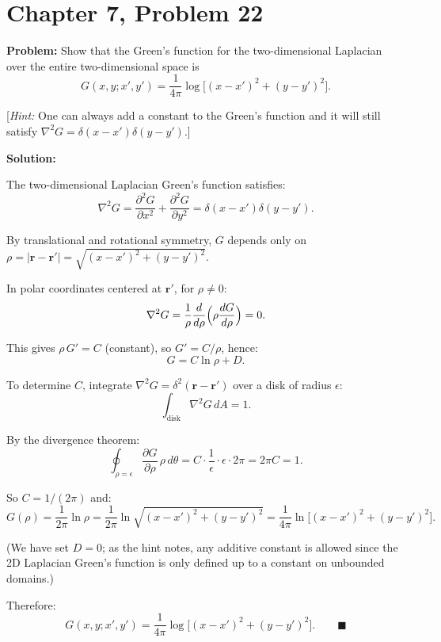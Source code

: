\documentclass[12pt]{article}
\begin{document}
\section*{Chapter 7, Problem 22}

\textbf{Problem:} Show that the Green's function for the two-dimensional Laplacian over the entire two-dimensional space is
\[
G(x,y;x',y') = \frac{1}{4\pi}\log\bigl[(x-x')^2 + (y-y')^2\bigr].
\]

[\textit{Hint:} One can always add a constant to the Green's function and it will still satisfy $\nabla^2 G = \delta(x-x')\delta(y-y')$.]

\bigskip
\textbf{Solution:}

The two-dimensional Laplacian Green's function satisfies:
\[
\nabla^2 G = \frac{\partial^2 G}{\partial x^2} + \frac{\partial^2 G}{\partial y^2} = \delta(x-x')\delta(y-y').
\]

By translational and rotational symmetry, $G$ depends only on $\rho = |\mathbf{r}-\mathbf{r}'| = \sqrt{(x-x')^2+(y-y')^2}$.

In polar coordinates centered at $\mathbf{r}'$, for $\rho \neq 0$:
\[
\nabla^2 G = \frac{1}{\rho}\frac{d}{d\rho}\Bigl(\rho\frac{dG}{d\rho}\Bigr) = 0.
\]

This gives $\rho\,G' = C$ (constant), so $G' = C/\rho$, hence:
\[
G = C\ln\rho + D.
\]

To determine $C$, integrate $\nabla^2 G = \delta^2(\mathbf{r}-\mathbf{r}')$ over a disk of radius $\epsilon$:
\[
\int_{\text{disk}}\nabla^2 G\,dA = 1.
\]

By the divergence theorem:
\[
\oint_{\rho=\epsilon}\frac{\partial G}{\partial\rho}\,\rho\,d\theta = C\cdot\frac{1}{\epsilon}\cdot\epsilon\cdot 2\pi = 2\pi C = 1.
\]

So $C = 1/(2\pi)$ and:
\[
G(\rho) = \frac{1}{2\pi}\ln\rho = \frac{1}{2\pi}\ln\sqrt{(x-x')^2+(y-y')^2} = \frac{1}{4\pi}\ln\bigl[(x-x')^2+(y-y')^2\bigr].
\]

(We have set $D = 0$; as the hint notes, any additive constant is allowed since the 2D Laplacian Green's function is only defined up to a constant on unbounded domains.)

Therefore:
\[
\boxed{G(x,y;x',y') = \frac{1}{4\pi}\log\bigl[(x-x')^2+(y-y')^2\bigr].} \qquad \blacksquare
\]
\end{document}
